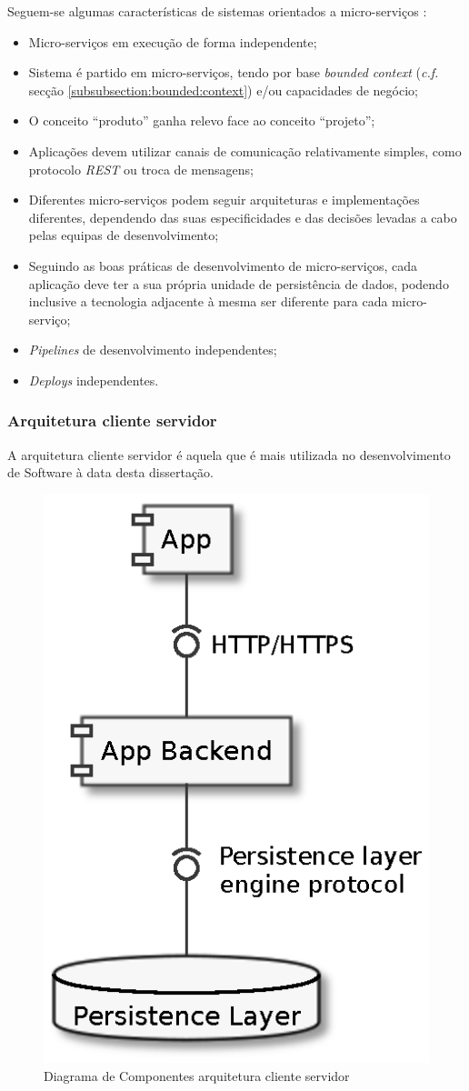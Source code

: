Seguem-se algumas características de sistemas orientados a micro-serviços \cite{microservices}:
\begin{itemize}
\item Micro-serviços em execução de forma independente;
\item Sistema é partido em micro-serviços, tendo por base \emph{bounded context} (\emph{c.f.} secção \ref{subsubsection:bounded:context}) e/ou capacidades de negócio;
\item O conceito “produto” ganha relevo face ao conceito “projeto”;
\item Aplicações devem utilizar canais de comunicação relativamente simples, como protocolo \emph{\acrshort{REST}} ou troca de mensagens;
\item Diferentes micro-serviços podem seguir arquiteturas e implementações diferentes, dependendo das suas especificidades e das decisões levadas a cabo pelas equipas de desenvolvimento;
\item Seguindo as boas práticas de desenvolvimento de micro-serviços, cada aplicação deve ter a sua própria unidade de persistência de dados, podendo inclusive a tecnologia adjacente à mesma ser diferente para cada micro-serviço;
\item \emph{Pipelines} de desenvolvimento independentes;
\item \emph{Deploys} independentes.
\end{itemize}

\subsubsection{Arquitetura cliente servidor \label{estado_arte_cliente_servidor}}
A arquitetura cliente servidor é aquela que é mais utilizada no desenvolvimento de Software à data desta dissertação. 

\begin{figure}[H]
    \begin{center}
    \includegraphics[height=0.5 \textwidth]{figures/actual_web.eps}
    \caption{Diagrama de Componentes arquitetura cliente servidor}
    \end{center}
\end{figure}


